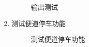 \documentclass[UTF8,titlepage]{ctexart}
\numberwithin{figure}{section}
\begin{document}
\begin{enumerate}
{\begin{figure}[H]
         \caption{输出测试}
         \label{}
        \end{figure}
    }
    \item 测试便道停车功能{
        \begin{figure}[H]
        \centering
         \caption{测试便道停车功能}
         \label{}
        \end{figure}
    }
\end{enumerate}
\end{document}
